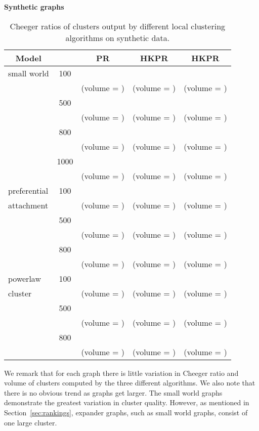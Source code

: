 \documentclass[runningheads,a4paper]{llncs}
\begin{document}
\begin{table}
\centering
\textbf{Synthetic graphs}\\
\begin{tabular}{|p{2cm}|c|c|c|c|}
\hline
\multicolumn{1}{|c|}{Model} &  & PR & HKPR & HKPR\\
\hline\hline
small world  & 100  &  &  & \\
             & & (volume = ) & (volume = ) & (volume = )\\\cline{2-5}
             & 500  &  &   & \\
             & & (volume = ) & (volume = ) & (volume = )\\\cline{2-5}
             & 800  &  &   & \\
             & & (volume = ) & (volume = ) & (volume = )\\\cline{2-5}
             & 1000 &  &  & \\
             & & (volume = ) & (volume = ) & (volume = )\\\hline
preferential & 100  &  &  & \\
attachment   & & (volume = ) & (volume = ) & (volume = )\\\cline{2-5}
             & 500  &  &  & \\
             & & (volume = ) & (volume = ) & (volume = )\\\cline{2-5}
             & 800  &  &  & \\
             & & (volume = ) & (volume = ) & (volume =
)\\\hline
powerlaw     & 100  &  &  & \\
cluster      & & (volume = ) & (volume = ) & (volume = )\\\cline{2-5}
             & 500  &  &  & \\
             & & (volume = ) & (volume = ) & (volume =
)\\\cline{2-5}
             & 800  &  &  & \\
             & & (volume = ) & (volume = ) & (volume = )\\
\hline 
\end{tabular}
\caption{Cheeger ratios of clusters output by different local clustering algorithms on
synthetic data.}
\label{table:cheegersynth}
\end{table}

We remark that for each graph there is little variation in Cheeger ratio and
volume of clusters computed by the three different algorithms.  We also note
that there is no obvious trend as graphs get larger.  The small world graphs
demonstrate the greatest variation in cluster quality.  However, as mentioned in
Section~\ref{sec:rankings}, expander graphs, such as small world graphs, consist
of one large cluster.
\end{document}
